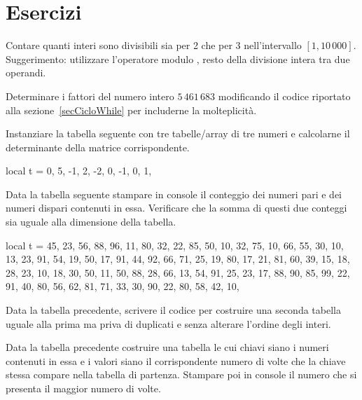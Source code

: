 \section{Esercizi}

\begin{Exercise}[label=cos-01]
Contare quanti interi sono divisibili sia per 2 che per 3 nell'intervallo \( [1,
10\,000]\). Suggerimento: utilizzare l'operatore modulo \key{\%}, resto della
divisione intera tra due operandi.
\end{Exercise}

\begin{Exercise}[label=cos-02]
Determinare i fattori del numero intero \(5\,461\,683\) modificando il codice
riportato alla sezione~\ref{secCicloWhile} per includerne la molteplicità.
\end{Exercise}

\begin{Exercise}[label=cos-03]
Instanziare la tabella seguente con tre tabelle/array di tre numeri e calcolarne
il determinante della matrice corrispondente.
\begin{lines}
local t = {
    { 0,  5, -1},
    { 2, -2,  0},
    {-1,  0,  1},
}
\end{lines}
\end{Exercise}

\begin{Exercise}[label=cos-04]
Data la tabella seguente stampare in console il conteggio dei numeri pari e dei
numeri dispari contenuti in essa. Verificare che la somma di questi due
conteggi sia uguale alla dimensione della tabella.
\begin{lines}
local t = {
    45, 23, 56, 88, 96, 11,
    80, 32, 22, 85, 50, 10,
    32, 75, 10, 66, 55, 30,
    10, 13, 23, 91, 54, 19,
    50, 17, 91, 44, 92, 66,
    71, 25, 19, 80, 17, 21,
    81, 60, 39, 15, 18, 28,
    23, 10, 18, 30, 50, 11,
    50, 88, 28, 66, 13, 54,
    91, 25, 23, 17, 88, 90,
    85, 99, 22, 91, 40, 80,
    56, 62, 81, 71, 33, 30,
    90, 22, 80, 58, 42, 10,
}
\end{lines}
\end{Exercise}

\begin{Exercise}[label=cos-05]
Data la tabella precedente, scrivere il codice per costruire una seconda tabella
uguale alla prima ma priva di duplicati e senza alterare l'ordine degli interi.
\end{Exercise}

\begin{Exercise}[label=cos-06]
Data la tabella precedente costruire una tabella le cui chiavi siano i numeri
contenuti in essa e i valori siano il corrispondente numero di volte che la
chiave stessa compare nella tabella di partenza. Stampare poi in console il
numero che si presenta il maggior numero di volte.
\end{Exercise}

